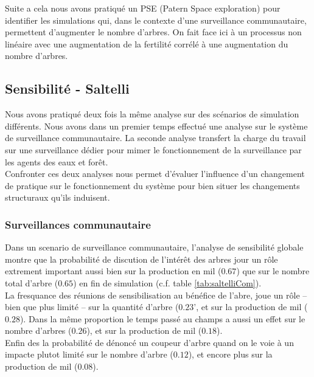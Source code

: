 \documentclass{article}
\begin{document}
Suite a cela nous avons pratiqué un PSE (Patern Space exploration) pour identifier les simulations qui, dans le contexte d'une surveillance communautaire, permettent d'augmenter le nombre d'arbres. On fait face ici à un processus non linéaire avec une augmentation de la fertilité corrélé à une augmentation du nombre d'arbres.

    \subsection{Sensibilité - Saltelli}

    Nous avons pratiqué deux fois la même analyse sur des scénarios de simulation différents. Nous avons dans un premier temps effectué une analyse sur le système de surveillance communautaire. La seconde analyse transfert la charge du travail sur une surveillance dédier pour mimer le fonctionnement de la surveillance par les agents des eaux et forêt.\\
    
    Confronter ces deux analyses nous permet d'évaluer l'influence d'un changement de pratique sur le fonctionnement du système pour bien situer les changements structuraux qu'ils induisent.

    \subsubsection{Surveillances communautaire}

        Dans un scenario de surveillance communautaire, l'analyse de sensibilité globale montre que la probabilité de discution de l'intérêt des arbres jour un rôle extrement important aussi bien sur la production en mil ($0.67$) que sur le nombre total d'arbre ($0.65$) en fin de simulation (c.f. table \ref{tab:saltelliCom}).\\

        La fresquance des réunions de sensibilisation au bénéfice de l'abre, joue un rôle -- bien que plus limité -- sur la quantité d'arbre ($0.23$', et sur la production de mil ($0.28$). Dans la même proportion le temps passé au champs a aussi un effet sur le nombre d'arbres ($0.26$), et sur la production de mil ($0.18$).\\

        Enfin des la probabilité de dénoncé un coupeur d'arbre quand on le voie à un impacte plutot limité sur le nombre d'arbre ($0.12$), et encore plus sur la production de mil ($0.08$).\\
\end{document}
